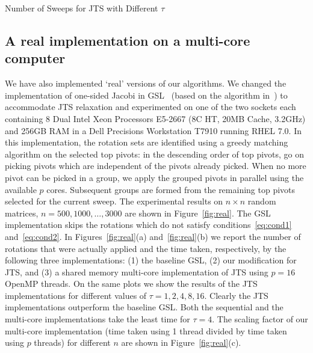 \documentclass[10pt, conference, compsocconf]{IEEEtran}
\begin{document}

\begin{table}
  \centering
  \caption{Number of Sweeps for JTS with Different $\tau$}
  \label{tab:varyk}
  
\end{table}

\subsection{A real implementation on a multi-core computer}

We have also implemented `real' versions of our algorithms. We changed the implementation of one-sided Jacobi in GSL~\cite{galassi1996gnu} (based on the algorithm in~\cite{nash1975one}) to accommodate JTS relaxation and experimented on one of the two sockets each containing 8 Dual Intel Xeon Processors E5-2667 (8C HT, 20MB Cache, 3.2GHz) and 256GB RAM in a Dell Precisions Workstation T7910 running RHEL 7.0. In this implementation, the rotation sets are identified using a greedy matching algorithm on the selected top pivots: in the descending order of top pivots, go on picking pivots which are independent of the pivots already picked. When no more pivot can be picked in a group, we apply the grouped pivots in parallel using the available $p$ cores. Subsequent groups are formed from the remaining top pivots selected for the current sweep. The experimental results on $n \times n$ random matrices, $n=500, 1000, \ldots, 3000$ are shown in Figure~\ref{fig:real}. The GSL implementation skips the rotations which do not satisfy conditions~\eqref{eq:cond1} and~\eqref{eq:cond2}. In Figures~\ref{fig:real}(a) and~\ref{fig:real}(b) we report the number of rotations that were actually applied and the time taken, respectively, by the following three implementations: (1) the baseline GSL, (2) our modification for JTS, and (3) a shared memory multi-core implementation of JTS using $p{=}16$ OpenMP threads. On the same plots we show the results of the JTS implementations for different values of $\tau {=} 1, 2, 4, 8, 16$. Clearly the JTS implementations outperform the baseline GSL. Both the sequential and the multi-core implementations take the least time for $\tau {=} 4$. The scaling factor of our multi-core implementation (time taken using 1 thread divided by time taken using $p$ threads) for different $n$ are shown in Figure~\ref{fig:real}(c).
\end{document}
